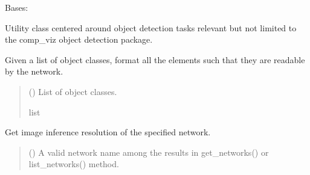 \documentclass[letterpaper,10pt,english]{sphinxmanual}
\begin{document}
\begin{fulllineitems}
\label{\detokenize{comp_viz.utils:comp_viz.utils.toolbox.ObjectDetection}}
\pysigstartsignatures
{}
\pysigstopsignatures
\sphinxAtStartPar
Bases: 

\sphinxAtStartPar
Utility class centered around object detection tasks relevant but not limited to the comp\_viz object detection package.

\begin{fulllineitems}
\label{\detokenize{comp_viz.utils:comp_viz.utils.toolbox.ObjectDetection.format_object_classes}}
\pysigstartsignatures
{}
\pysigstopsignatures
\sphinxAtStartPar
Given a list of object classes, format all the elements such that they are readable by the network.
\begin{quote}\begin{description}
\sphinxAtStartPar
{} () \textendash{} List of object classes.

\sphinxAtStartPar
list

\end{description}\end{quote}

\end{fulllineitems}


\begin{fulllineitems}
\label{\detokenize{comp_viz.utils:comp_viz.utils.toolbox.ObjectDetection.get_network_resolution}}
\pysigstartsignatures
{}
\pysigstopsignatures
\sphinxAtStartPar
Get image inference resolution of the specified network.
\begin{quote}\begin{description}
\sphinxAtStartPar
{} () \textendash{} A valid network name among the results in get\_networks() or list\_networks() method.


\end{description}
\end{quote}
\end{fulllineitems}
\end{fulllineitems}
\end{document}
